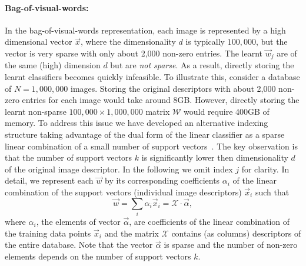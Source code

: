   \paragraph{Bag-of-visual-words:}
    In the bag-of-visual-words representation, each image is represented by a high dimensional vector $\vec{x}$, where the dimensionality $d$ is typically $100,000$, but the vector is very sparse with only about 2,000 non-zero entries. 
    The learnt $\vec{w}_j$ are of the same (high) dimension $d$ but are {\em not sparse}. As a result, directly storing the learnt classifiers becomes quickly infeasible.
    To illustrate this, consider a database of $N=1,000,000$ images. Storing the original descriptors with about 2,000 non-zero entries for each image would take around 8GB. However, directly storing the learnt non-sparse $100,000\times 1,000,000 $ matrix $\mathcal{W}$ would require 400GB of memory. %
    To address this issue we have developed an alternative indexing structure taking advantage of the dual form of the linear classifier as a sparse linear combination of a small number of support vectors~\cite{scholkopf2002learning}.   
    The key observation is that the number of support vectors $k$ is significantly lower then dimensionality $d$ of the original image descriptor. In the following we omit index $j$ for clarity.  In detail, we represent each $\vec{w}$ by its corresponding coefficients $\alpha_i$ of the linear combination of the support vectors (individual image descriptors) $\vec{x}_i$ such that
      \begin{equation}
        \vec{w}=\sum_{i} \alpha_i \vec{x}_i = \mathcal{X} \cdot \vec{\alpha},
        \label{eq:dual}
      \end{equation}
      \noindent
    where $\alpha_i$, the elements of vector $\vec{\alpha}$, are coefficients of the linear combination of the training data points $\vec{x}_i$ and the matrix $\mathcal{X}$ contains (as columns) descriptors of the entire database. Note that the vector $\vec{\alpha}$ is sparse and the number of non-zero elements depends on the number of support vectors $k$. 

